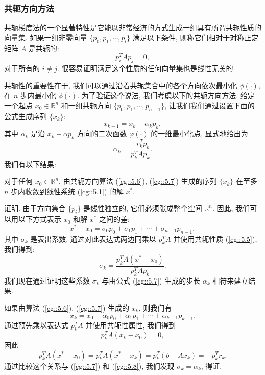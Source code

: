 \documentclass[a4paper]{ctexart}
\newcommand{\hl}[1]
{\noindent {\bf {#1}}}
\begin{document}
{\subsubsection*{共轭方向方法}

共轭梯度法的一个显著特性是它能以非常经济的方式生成一组具有所谓共轭性质的向量集. 
如果一组非零向量 $\{p_0, p_1, \cdots, p_l\}$ 
满足以下条件, 则称它们相对于对称正定矩阵 $A$ 是共轭的:
\begin{equation} 
  p_i^T A p_j = 0, \label{cg::5.5} 
\end{equation}
对于所有的 $i \neq j$. 
很容易证明满足这个性质的任何向量集也是线性无关的. 

共轭性的重要性在于, 我们可以通过沿着共轭集合中的各个方向依次最小化 $\phi(\cdot)$, 
在 $n$ 步内最小化 $\phi(\cdot)$. 
为了验证这个说法, 我们考虑以下的共轭方向方法. 
给定一个起点 $x_0 \in \mathbb{R}^n$ 
和一组共轭方向 $\{p_0, p_1, \cdots, p_{n - 1}\}$, 
让我们我们通过设置下面的公式生成序列 $\{x_k\}$:
\begin{equation} 
  x_{k+1} = x_k + \alpha_k p_k, \label{cg::5.6} 
\end{equation}
其中 $\alpha_k$ 是沿 $x_k + \alpha p_k$ 方向的二次函数 
$φ(\cdot)$ 的一维最小化点, 显式地给出为
\begin{equation} 
  \alpha_k = \frac{-r_k^T p_k}{p_k^T A p_k}.  \label{cg::5.7} 
\end{equation}
我们有以下结果:

\hl{定理 1}
对于任何 $x_0 \in \mathbb{R}^n$, 
由共轭方向算法 (\ref{cg::5.6}), (\ref{cg::5.7}) 生成的序列 
$\{x_k\}$ 在至多 $n$ 步内收敛到线性系统 (\ref{cg::5.1}) 的解 $x^*$.

证明. 由于方向集合 $\{p_i\}$ 是线性独立的, 
它们必须张成整个空间 $\mathbb{R}^n$. 因此, 
我们可以用以下方式表示 $x_0$ 和解 $x^*$ 之间的差:
\begin{equation*} 
  x^* - x_0 
  = \sigma_0 p_0 + \sigma_1 p_1 + \cdots + \sigma_{n - 1} p_{n - 1}, 
\end{equation*}
其中 $\sigma_k$ 是表出系数. 通过对此表达式两边同乘以 $p_k^T A$ 
并使用共轭性质 (\ref{cg::5.5}), 我们得到:
\begin{equation} 
  \sigma_k = \frac{p_k^T A (x^* - x_0)}{p_k^T A p_k}. \label{cg::5.8} 
\end{equation}
我们现在通过证明这些系数 $\sigma_k$ 与由公式 (\ref{cg::5.7}) 
生成的步长 $\alpha_k$ 相符来建立结果. 

如果由算法 (\ref{cg::5.6}), (\ref{cg::5.7}) 生成的 $x_k$, 则我们有
$$
x_k  = x_0 + \alpha_0 p_0 + \alpha_1 p_1 + \cdots + \alpha_{k - 1} p_{k - 1}.
$$
通过预先乘以表达式 $p_k^T A$ 并使用共轭性属性, 我们得到
$$
p_k^T A(x_k - x_0) = 0,
$$
因此
$$
p_k^T A(x^* - x_0) = p_k^T A(x^* - x_k) = p_k^T (b - Ax_k) = -p_k^T r_k.
$$
通过比较这个关系与 (\ref{cg::5.7}) 和 (\ref{cg::5.8}), 我们发现 
$\sigma_k = \alpha_k$, 得证.

}
\end{document}
